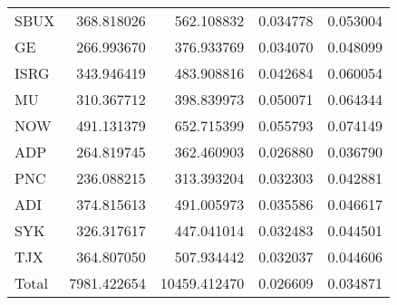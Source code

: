 \documentclass{gji}
\begin{document}
{\begin{tabular}{@{}lrrrr}
SBUX & 368.818026 & 562.108832 & 0.034778 & 0.053004 \\
GE & 266.993670 & 376.933769 & 0.034070 & 0.048099 \\
ISRG & 343.946419 & 483.908816 & 0.042684 & 0.060054 \\
MU & 310.367712 & 398.839973 & 0.050071 & 0.064344 \\
NOW & 491.131379 & 652.715399 & 0.055793 & 0.074149 \\
ADP & 264.819745 & 362.460903 & 0.026880 & 0.036790 \\
PNC & 236.088215 & 313.393204 & 0.032303 & 0.042881 \\
ADI & 374.815613 & 491.005973 & 0.035586 & 0.046617 \\
SYK & 326.317617 & 447.041014 & 0.032483 & 0.044501 \\
TJX & 364.807050 & 507.934442 & 0.032037 & 0.044606 \\
Total & 7981.422654 & 10459.412470 & 0.026609 & 0.034871 \\
\hline
\end{tabular}}
\end{document}
